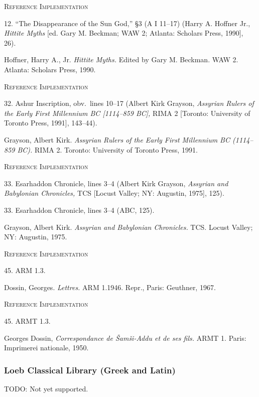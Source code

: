 \documentclass[a4paper]{article}
\newenvironment{refimp}{%
  \begin{minipage}{\linewidth}
    \setlength{\parskip}{1ex}
    \textsc{Reference Implementation}\par
    \nobreak
    \color{reference-colour}
}{\end{minipage}}
\begin{document}
\begin{refimp}
  12. “The Disappearance of the Sun God,” §3 (A I 11–17) (Harry A. Hoffner
  Jr., \emph{Hittite Myths} [ed. Gary M. Beckman; WAW 2; Atlanta: Scholars
  Press, 1990], 26).
  
  \hangindent\bibindent Hoffner, Harry A., Jr. \emph{Hittite Myths.} Edited by
  Gary M. Beckman. WAW 2. Atlanta: Scholars Press, 1990.
\end{refimp}

\begin{refimp}
  32. Ashur Inscription, obv.\ lines 10–17 (Albert Kirk Grayson,
  \emph{Assyrian Rulers of the Early First Millennium BC [1114–859 BC],} RIMA
  2 [Toronto: University of Toronto Press, 1991], 143–44).

  \hangindent\bibindent Grayson, Albert Kirk. \emph{Assyrian Rulers of the
  Early First Millennium BC (1114–859 BC).} RIMA 2. Toronto: University of
  Toronto Press, 1991.
\end{refimp}

\begin{refimp}
  33. Esarhaddon Chronicle, lines 3–4 (Albert Kirk Grayson, \emph{Assyrian and
  Babylonian Chronicles,} TCS [Locust Valley; NY: Augustin, 1975], 125).

  33. Esarhaddon Chronicle, lines 3–4 (ABC, 125).

  \hangindent\bibindent Grayson, Albert Kirk. \emph{Assyrian and Babylonian
  Chronicles.} TCS. Locust Valley; NY: Augustin, 1975.
\end{refimp}

\begin{refimp}
  45. ARM 1.3.

  \hangindent\bibindent Dossin, Georges. \emph{Lettres.} ARM 1.1946. Repr.,
  Paris: Geuthner, 1967.
\end{refimp}

\begin{refimp}
  45. ARMT 1.3.

  \hangindent\bibindent Georges Dossin, \emph{Correspondance de Šamši-Addu et de
  ses fils.} ARMT 1. Paris: Imprimerei nationale, 1950.
\end{refimp}

\subsubsection{Loeb Classical Library (Greek and Latin)}

TODO: Not yet supported.
\end{document}
